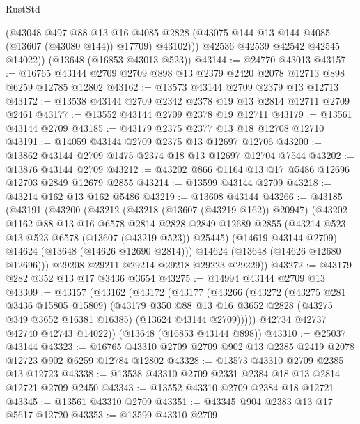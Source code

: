 \begin{lexlean}{RustStd}
\begin{coremodule}
            (@43048
              @497
              @88
              @13
              @16
              @4085
              @2828
              (@43075 @144 @13 @144 @4085 (@13607 (@43080 @144)) @17709)
              @43102)))
        @42536
        @42539
        @42542
        @42545
        @14022))
    (@13648 (@16853 @43013 @523))
@43144 := @24770 @43013
@43157 := @16765 @43144 @2709 @2709 @898 @13 @2379 @2420 @2078 @12713 @898 @6259 @12785 @12802
@43162 := @13573 @43144 @2709 @2379 @13 @12713
@43172 := @13538 @43144 @2709 @2342 @2378 @19 @13 @2814 @12711 @2709 @2461
@43177 := @13552 @43144 @2709 @2378 @19 @12711
@43179 := @13561 @43144 @2709
@43185 := @43179 @2375 @2377 @13 @18 @12708 @12710
@43191 := @14059 @43144 @2709 @2375 @13 @12697 @12706
@43200 := @13862 @43144 @2709 @1475 @2374 @18 @13 @12697 @12704 @7544
@43202 := @13876 @43144 @2709
@43212 := @43202 @866 @1164 @13 @17 @5486 @12696 @12703 @2849 @12679 @2855
@43214 := @13599 @43144 @2709
@43218 := @43214 @162 @13 @162 @5486
@43219 := @13608 @43144
@43266 := @43185
    (@43191
      (@43200
        (@43212
          (@43218 (@13607 (@43219 @162)) @20947)
          (@43202
            @1162
            @88
            @13
            @16
            @6578
            @2814
            @2828
            @2849
            @12689
            @2855
            (@43214 @523 @13 @523 @6578 (@13607 (@43219 @523)) @25445)
            (@14619 @43144 @2709)
            @14624
            (@13648 (@14626 @12690 @2814)))
          @14624
          (@13648 (@14626 @12680 @12696)))
        @29208
        @29211
        @29214
        @29218
        @29223
        @29229))
@43272 := @43179 @282 @352 @13 @17 @3436 @3654
@43275 := @14994 @43144 @2709 @13
@43309 := @43157
    (@43162
      (@43172
        (@43177
          (@43266
            (@43272
              (@43275 @281 @3436 @15805 @15809)
              (@43179
                @350
                @88
                @13
                @16
                @3652
                @2828
                (@43275 @349 @3652 @16381 @16385)
                (@13624 @43144 @2709)))))
        @42734
        @42737
        @42740
        @42743
        @14022))
    (@13648 (@16853 @43144 @898))
@43310 := @25037 @43144
@43323 := @16765 @43310 @2709 @2709 @902 @13 @2385 @2419 @2078 @12723 @902 @6259 @12784 @12802
@43328 := @13573 @43310 @2709 @2385 @13 @12723
@43338 := @13538 @43310 @2709 @2331 @2384 @18 @13 @2814 @12721 @2709 @2450
@43343 := @13552 @43310 @2709 @2384 @18 @12721
@43345 := @13561 @43310 @2709
@43351 := @43345 @904 @2383 @13 @17 @5617 @12720
@43353 := @13599 @43310 @2709

\end{coremodule}
\end{lexlean}
